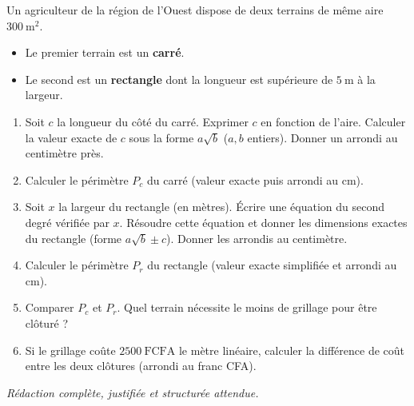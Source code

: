\documentclass[11pt]{article}
\begin{document}
\begin{exercice}
Un agriculteur de la région de l'Ouest dispose de deux terrains de même aire $300~\text{m}^2$.
\begin{itemize}
    \item Le premier terrain est un \textbf{carré}.
    \item Le second est un \textbf{rectangle} dont la longueur est supérieure de $5~\text{m}$ à la largeur.
\end{itemize}
\begin{enumerate}
    \item Soit $c$ la longueur du côté du carré. Exprimer $c$ en fonction de l'aire. Calculer la valeur exacte de $c$ sous la forme $a\sqrt{b}$ ($a,b$ entiers). Donner un arrondi au centimètre près.
    \item Calculer le périmètre $P_c$ du carré (valeur exacte puis arrondi au cm).
    \item Soit $x$ la largeur du rectangle (en mètres). Écrire une équation du second degré vérifiée par $x$. Résoudre cette équation et donner les dimensions exactes du rectangle (forme $a\sqrt{b} \pm c$). Donner les arrondis au centimètre.
    \item Calculer le périmètre $P_r$ du rectangle (valeur exacte simplifiée et arrondi au cm).
    \item Comparer $P_c$ et $P_r$. Quel terrain nécessite le moins de grillage pour être clôturé ?
    \item Si le grillage coûte $2500~\text{FCFA}$ le mètre linéaire, calculer la différence de coût entre les deux clôtures (arrondi au franc CFA).
\end{enumerate}
\textit{Rédaction complète, justifiée et structurée attendue.}
\end{exercice}
\end{document}
